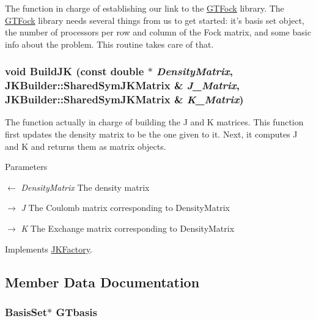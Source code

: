 The function in charge of establishing our link to the \hyperlink{namespaceGTFock}{GTFock} library. The \hyperlink{namespaceGTFock}{GTFock} library needs several things from us to get started: it's basis set object, the number of processors per row and column of the Fock matrix, and some basic info about the problem. This routine takes care of that. \hypertarget{classGTFock_1_1DistGTFock_aea85d0b3d84e8e52819e8a15201e078a}{
\subsubsection[{BuildJK}]{\setlength{\rightskip}{0pt plus 5cm}void BuildJK (const double $\ast$ {\em DensityMatrix}, \/  {\bf JKBuilder::SharedSymJKMatrix} \& {\em J\_\-Matrix}, \/  {\bf JKBuilder::SharedSymJKMatrix} \& {\em K\_\-Matrix})}}
\label{classGTFock_1_1DistGTFock_aea85d0b3d84e8e52819e8a15201e078a}


The function actually in charge of building the J and K matrices. This function first updates the density matrix to be the one given to it. Next, it computes J and K and returns them as matrix objects.


\begin{DoxyParams}{Parameters}
\item[\mbox{$\leftarrow$} {\em DensityMatrix}]The density matrix \item[\mbox{$\rightarrow$} {\em J}]The Coulomb matrix corresponding to DensityMatrix \item[\mbox{$\rightarrow$} {\em K}]The Exchange matrix corresponding to DensityMatrix \end{DoxyParams}


Implements \hyperlink{classJKBuilder_1_1JKFactory_ae253b309dafe3ce003fdabfd315318b8}{JKFactory}.

\subsection{Member Data Documentation}
\hypertarget{classGTFock_1_1DistGTFock_acf01612812393db2711417ca40f2d629}{
\subsubsection[{GTbasis}]{\setlength{\rightskip}{0pt plus 5cm}BasisSet$\ast$ {\bf GTbasis}}}
\label{classGTFock_1_1DistGTFock_acf01612812393db2711417ca40f2d629}


